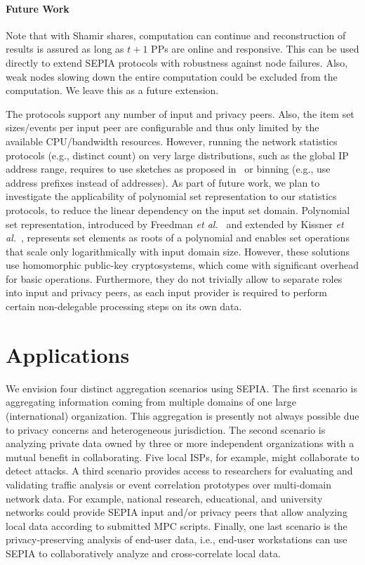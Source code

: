 \documentclass[letterpaper,11pt,onecolumn,titlepage]{article}
\begin{document}
\paragraph{Future Work}
Note that with Shamir shares, computation can continue and reconstruction of results is assured as long as $t+1$ PPs are online and responsive. This can be used directly to extend SEPIA protocols with robustness against node failures. Also, weak nodes slowing down the entire computation could be excluded from the computation. We leave this as a future extension.

The protocols support any number of input and privacy
peers. Also, the item set sizes/events per input peer are configurable and thus only
limited by the available CPU/bandwidth resources. 
However, running the network statistics protocols (e.g., distinct count) on very large distributions, such as the global IP address range, requires to use sketches as proposed in~\cite{roughan2006sdd} or binning (e.g., use address prefixes instead of addresses).
As part of future work, we plan to investigate the applicability of polynomial set representation to our statistics protocols, to reduce the linear dependency on the input set domain. Polynomial set representation, introduced by Freedman \emph{et al.}~\cite{freedman2004pm} and extended by Kissner 
\emph{et al.}~\cite{kissner2005pps}, represents set elements as roots of a polynomial and enables set operations that scale only logarithmically with input domain size.
However, these solutions use homomorphic public-key cryptosystems, which come with significant overhead for basic operations. Furthermore, they do not trivially allow to separate roles into input and privacy peers, as each input provider is required to 
perform certain non-delegable processing steps on its own data.

\section{Applications}
\label{sec:applications}





We envision four distinct aggregation scenarios using SEPIA. The first
scenario is aggregating information coming from multiple domains of
one large (international) organization. This aggregation is presently
not always possible due to privacy concerns and heterogeneous jurisdiction. The
second scenario is analyzing private data owned by three or more
independent organizations with a mutual benefit in collaborating. Five
local ISPs, for example, might collaborate to detect attacks. A third
scenario provides access to researchers for evaluating and validating
traffic analysis or event correlation prototypes over multi-domain
network data. For example, national research, educational, and
university networks could provide SEPIA input and/or privacy peers that allow
analyzing local data according to submitted MPC scripts. Finally,
one last scenario is the privacy-preserving analysis of end-user data,
i.e., end-user workstations can use SEPIA to collaboratively analyze
and cross-correlate local data. 
\end{document}
